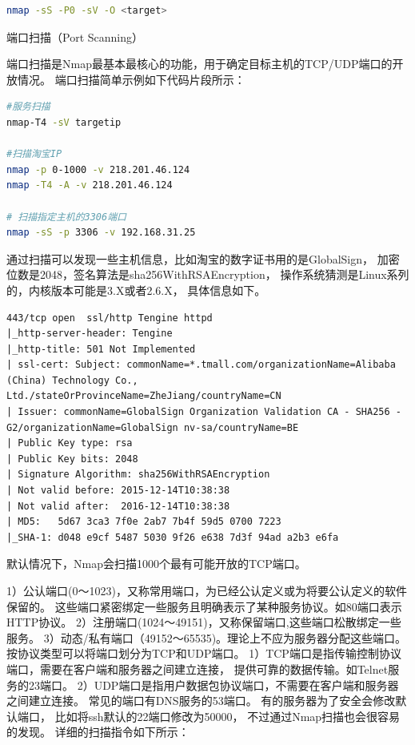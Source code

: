 \documentclass[12pt]{book}
\makeatletter
\numberwithin{dummy}{section}
\theoremstyle{ocrenumbox}
\theoremstyle{blacknumex}
\theoremstyle{blacknumbox}
\theoremstyle{ocrenum}
\renewcommand{\subsection}{\@startsection {subsection}{2}{\z@}
	{-3ex \@plus -0.1ex \@minus -.4ex}
	{0.5ex \@plus.2ex }
	{\normalfont\sffamily\bfseries}}
\makeatother
\begin{document}
\begin{lstlisting}[language=Bash]
nmap -sS -P0 -sV -O <target>
\end{lstlisting}

\subsection{端口扫描（Port Scanning）}

端口扫描是Nmap最基本最核心的功能，用于确定目标主机的TCP/UDP端口的开放情况。
端口扫描简单示例如下代码片段所示：

\begin{lstlisting}[language=Bash]
#服务扫描
nmap-T4 -sV targetip 

#扫描淘宝IP
nmap -p 0-1000 -v 218.201.46.124
nmap -T4 -A -v 218.201.46.124

# 扫描指定主机的3306端口
nmap -sS -p 3306 -v 192.168.31.25
\end{lstlisting}

通过扫描可以发现一些主机信息，比如淘宝的数字证书用的是GlobalSign，
加密位数是2048，签名算法是sha256WithRSAEncryption，
操作系统猜测是Linux系列的，内核版本可能是3.X或者2.6.X，
具体信息如下。

\begin{lstlisting}
443/tcp open  ssl/http Tengine httpd
|_http-server-header: Tengine
|_http-title: 501 Not Implemented
| ssl-cert: Subject: commonName=*.tmall.com/organizationName=Alibaba (China) Technology Co., Ltd./stateOrProvinceName=ZheJiang/countryName=CN
| Issuer: commonName=GlobalSign Organization Validation CA - SHA256 - G2/organizationName=GlobalSign nv-sa/countryName=BE
| Public Key type: rsa
| Public Key bits: 2048
| Signature Algorithm: sha256WithRSAEncryption
| Not valid before: 2015-12-14T10:38:38
| Not valid after:  2016-12-14T10:38:38
| MD5:   5d67 3ca3 7f0e 2ab7 7b4f 59d5 0700 7223
|_SHA-1: d048 e9cf 5487 5030 9f26 e638 7d3f 94ad a2b3 e6fa
\end{lstlisting}

默认情况下，Nmap会扫描1000个最有可能开放的TCP端口。

1）公认端口(0～1023)，又称常用端口，为已经公认定义或为将要公认定义的软件保留的。
这些端口紧密绑定一些服务且明确表示了某种服务协议。如80端口表示HTTP协议。
2）注册端口(1024～49151)，又称保留端口,这些端口松散绑定一些服务。
3）动态/私有端口（49152～65535)。理论上不应为服务器分配这些端口。
按协议类型可以将端口划分为TCP和UDP端口。
1）TCP端口是指传输控制协议端口，需要在客户端和服务器之间建立连接，
提供可靠的数据传输。如Telnet服务的23端口。
2）UDP端口是指用户数据包协议端口，不需要在客户端和服务器之间建立连接。
常见的端口有DNS服务的53端口。
有的服务器为了安全会修改默认端口，
比如将ssh默认的22端口修改为50000，
不过通过Nmap扫描也会很容易的发现。
详细的扫描指令如下所示：
\end{document}

